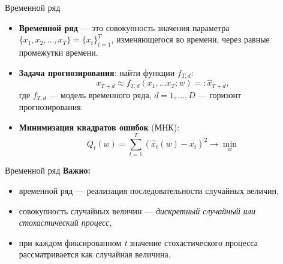 
\usepackage{tikz}
\usepackage[english,russian]{babel}
\usepackage[labelformat=empty]{caption}
\usetikzlibrary{arrows,shapes,positioning,shadows,trees}
\newcommand*{\defeq}{\stackrel{\text{def}}{=}}


\begin{frame}
\titlepage
\end{frame}
\begin{frame}{Временной ряд}
\begin{itemize}
\item \textbf{Временной ряд} --- это совокупность значения параметра $\{x_1, x_2,...,x_T\}= \{ x_t \}_{t=1}^T$, изменяющегося во времени,  через равные промежутки времени.

\item \textbf{Задача прогнозирования}: найти функции $f_{T,d}$:
\begin{equation*}
x_{T+d} \approx f_{T,d}(x_1,...x_T;w) =: \hat{x}_{T+d}, 
\end {equation*}
где $f_{T,d}$ --- модель временного ряда, $d =1,...,D$ --- горизонт прогнозирования.
\item \textbf{Минимизация квадратов ошибок} (МНК):
    \begin{equation*}
        Q_t(w) = \sum_{t = 1}^{T}(\hat{x}_{t}(w) - x_t)^2 \rightarrow \min_w
    \end{equation*}
\end{itemize}
\end{frame}
\begin{frame}{Временной ряд}
\textbf{Важно:}
\begin{itemize}
    \item временной ряд --- реализация последовательности случайных величин,
    \item совокупность случайных величин --- \textit{дискретный случайный или стохастический процесс},
    \item при каждом фиксированном \textit{t} значение стохастического процесса рассматривается как случайная величина.
\end{itemize}

\end{frame}
